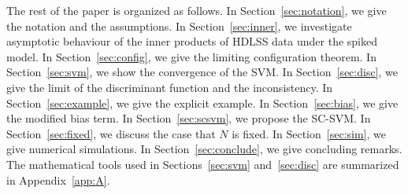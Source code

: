 The rest of the paper is organized as follows. In Section~\ref{sec:notation}, we
give the notation and the assumptions. In Section~\ref{sec:inner}, we investigate
asymptotic behaviour of the inner products of HDLSS data under the spiked model.
In Section~\ref{sec:config}, we give the limiting configuration theorem. In
Section~\ref{sec:svm}, we show the convergence of the SVM. In
Section~\ref{sec:disc}, we give the limit of the discriminant function and the
inconsistency. In Section~\ref{sec:example}, we give the explicit example. In
Section~\ref{sec:bias}, we give the modified bias term. In
Section~\ref{sec:scsvm}, we propose the SC-SVM. In Section~\ref{sec:fixed}, we
discuss the case that $N$ is fixed. In Section~\ref{sec:sim}, we give numerical
simulations. In Section~\ref{sec:conclude}, we give concluding remarks. The
mathematical tools used in Sections~\ref{sec:svm} and~\ref{sec:disc} are summarized
in Appendix~\ref{app:A}.
